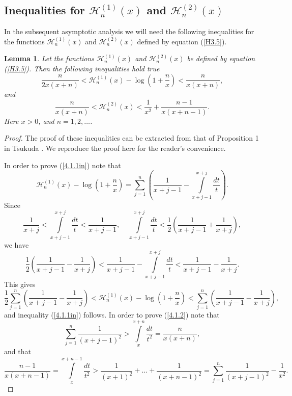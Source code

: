 \documentclass[12pt]{amsart}
\newtheorem{lem}[thm]{Lemma}
\theoremstyle{definition}
\numberwithin{equation}{section}
\begin{document}
\subsection{Inequalities for $\mathcal{H}_n^{(1)}(x)$ and
$\mathcal{H}_n^{(2)}(x)$}\label{SectionInequalitiesHfunctions}
In the subsequent asymptotic analysis we will need
the following inequalities for the functions  $\mathcal{H}_n^{(1)}(x)$ and
$\mathcal{H}_n^{(2)}(x)$ defined by equation (\ref{H3.5}).
\begin{lem}\label{4.1.1}
Let the functions  $\mathcal{H}_n^{(1)}(x)$ and
$\mathcal{H}_n^{(2)}(x)$ be defined by equation (\ref{H3.5}). Then the following inequalities hold true
\begin{equation}\label{4.1.1in}
\frac{n}{2x(x+n)}<\mathcal{H}_n^{(1)}(x)-\log\left(1+\frac{n}{x}\right)<\frac{n}{x(x+n)},
\end{equation}
and
\begin{equation}\label{4.1.2}
\frac{n}{x(x+n)}<\mathcal{H}_n^{(2)}(x)<\frac{1}{x^2}+\frac{n-1}{x(x+n-1)}.
\end{equation}
Here $x>0$, and $n=1,2,\ldots$.
\end{lem}
\begin{proof}The proof of these inequalities can be extracted
from that of Proposition 1 in Tsukuda \cite{Tsukuda}. We reproduce
the proof here for the reader's convenience.

In order to prove (\ref{4.1.1in}) note that
$$
\mathcal{H}_n^{(1)}(x)-\log\left(1+\frac{n}{x}\right)=\sum\limits_{j=1}^n
\left(\frac{1}{x+j-1}-\int\limits_{x+j-1}^{x+j}\frac{dt}{t}\right).
$$
Since
$$
\frac{1}{x+j}<\int\limits_{x+j-1}^{x+j}\frac{dt}{t}<\frac{1}{x+j-1},\;\;\;\;
\int\limits_{x+j-1}^{x+j}\frac{dt}{t}<\frac{1}{2}\left(\frac{1}{x+j-1}+\frac{1}{x+j}\right),
$$
we have
$$
\frac{1}{2}\left(\frac{1}{x+j-1}-\frac{1}{x+j}\right)<\frac{1}{x+j-1}-\int\limits_{x+j-1}^{x+j}\frac{dt}{t}<\frac{1}{x+j-1}-\frac{1}{x+j}.
$$
This gives
$$
\frac{1}{2}\sum\limits_{j=1}^n\left(\frac{1}{x+j-1}-\frac{1}{x+j}\right)<
\mathcal{H}_n^{(1)}(x)-\log\left(1+\frac{n}{x}\right)
<\sum\limits_{j=1}^n\left(\frac{1}{x+j-1}-\frac{1}{x+j}\right),
$$
and inequality (\ref{4.1.1in}) follows. In order to prove (\ref{4.1.2}) note that
$$
\sum\limits_{j=1}^n\frac{1}{\left(x+j-1\right)^2}>\int\limits_x^{x+n}\frac{dt}{t^2}=\frac{n}{x(x+n)},
$$
and that
$$
\frac{n-1}{x(x+n-1)}=\int\limits_x^{x+n-1}\frac{dt}{t^2}>\frac{1}{(x+1)^2}+\ldots+
\frac{1}{(x+n-1)^2}=\sum\limits_{j=1}^n\frac{1}{(x+j-1)^2}-\frac{1}{x^2}.
$$
\end{proof}
\end{document}
